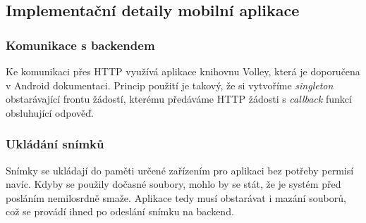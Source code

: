 \subsection{Implementační detaily mobilní aplikace}

\subsubsection*{Komunikace s backendem}

\noindent
Ke komunikaci přes HTTP využívá aplikace knihovnu Volley, která je doporučena
v Android dokumentaci. Princip použití je takový, že si vytvoříme
\textit{singleton} obstarávající frontu žádostí, kterému předáváme HTTP žádosti s
\textit{callback} funkcí obsluhující odpověď. \citep[][]{Volley1}

\subsubsection*{Ukládání snímků}

\noindent
Snímky se ukládají do paměti určené zařízením pro aplikaci bez potřeby permisí navíc.
Kdyby se použily dočasné soubory,
mohlo by se stát, že je systém před posláním nemilosrdně smaže.
\citep[][]{AndroidMem}
Aplikace tedy musí obstarávat i mazání souborů, což se provádí
ihned po odeslání snímku na backend.
